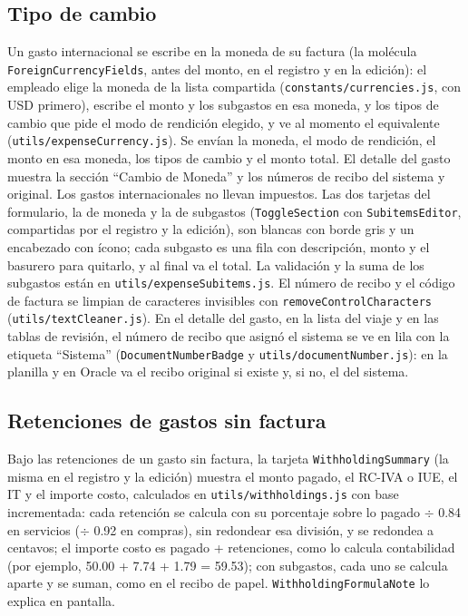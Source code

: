 \documentclass[11pt,letterpaper]{article}
\newcommand{\code}[1]{\nolinkurl{#1}}
\begin{document}
\subsection{Tipo de cambio}
Un gasto internacional se escribe en la moneda de su factura (la molécula \code{ForeignCurrencyFields}, antes del monto, en el registro y en la edición): el empleado elige la moneda de la lista compartida (\code{constants/currencies.js}, con USD primero), escribe el monto y los subgastos en esa moneda, y los tipos de cambio que pide el modo de rendición elegido, y ve al momento el equivalente (\code{utils/expenseCurrency.js}). Se envían la moneda, el modo de rendición, el monto en esa moneda, los tipos de cambio y el monto total. El detalle del gasto muestra la sección ``Cambio de Moneda'' y los números de recibo del sistema y original. Los gastos internacionales no llevan impuestos. Las dos tarjetas del formulario, la de moneda y la de subgastos (\code{ToggleSection} con \code{SubitemsEditor}, compartidas por el registro y la edición), son blancas con borde gris y un encabezado con ícono; cada subgasto es una fila con descripción, monto y el basurero para quitarlo, y al final va el total. La validación y la suma de los subgastos están en \code{utils/expenseSubitems.js}. El número de recibo y el código de factura se limpian de caracteres invisibles con \code{removeControlCharacters} (\code{utils/textCleaner.js}). En el detalle del gasto, en la lista del viaje y en las tablas de revisión, el número de recibo que asignó el sistema se ve en lila con la etiqueta ``Sistema'' (\code{DocumentNumberBadge} y \code{utils/documentNumber.js}): en la planilla y en Oracle va el recibo original si existe y, si no, el del sistema.

\subsection{Retenciones de gastos sin factura}
Bajo las retenciones de un gasto sin factura, la tarjeta \code{WithholdingSummary} (la misma en el registro y la edición) muestra el monto pagado, el RC-IVA o IUE, el IT y el importe costo, calculados en \code{utils/withholdings.js} con base incrementada: cada retención se calcula con su porcentaje sobre lo pagado $\div$ 0.84 en servicios ($\div$ 0.92 en compras), sin redondear esa división, y se redondea a centavos; el importe costo es pagado + retenciones, como lo calcula contabilidad (por ejemplo, 50.00 + 7.74 + 1.79 = 59.53); con subgastos, cada uno se calcula aparte y se suman, como en el recibo de papel. \code{WithholdingFormulaNote} lo explica en pantalla.
\end{document}
